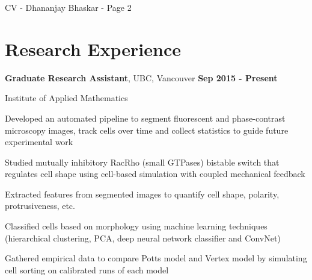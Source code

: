 \documentclass[margin,line]{res}
\newenvironment{list1}{
  \begin{list}{\ding{113}}{
      \setlength{\itemsep}{0in}
      \setlength{\parsep}{0in} \setlength{\parskip}{0in}
      \setlength{\topsep}{0in} \setlength{\partopsep}{0in} 
      \setlength{\leftmargin}{0.17in}}}{\end{list}}
\newenvironment{list3}{
  \begin{list}{\textopenbullet}{
      \setlength{\itemsep}{0in}
      \setlength{\parsep}{0in} \setlength{\parskip}{0in}
      \setlength{\topsep}{0in} \setlength{\partopsep}{0in} 
      \setlength{\leftmargin}{0.1in}}}{\end{list}}
\begin{document}
\begin{resume}
\newpage
\begin{flushright}
CV - Dhananjay Bhaskar - Page 2
\end{flushright}
\vspace*{.2cm}

\section{\sc Research Experience}

{\bf Graduate Research Assistant}, UBC, Vancouver \hfill {\bf Sep 2015 - Present}\\
\vspace*{-.2cm}
\begin{list1}
\item[] Institute of Applied Mathematics
\vspace*{.1cm}
\begin{list3}
\item Developed an automated pipeline to segment fluorescent and phase-contrast microscopy images, track cells over time and collect statistics to guide future experimental work
\item Studied mutually inhibitory Rac{\textendash}Rho (small GTPases) bistable switch that regulates cell shape using cell-based simulation with coupled mechanical feedback
\item Extracted features from segmented images to quantify cell shape, polarity, protrusiveness, etc.
\item Classified cells based on morphology using machine learning techniques (hierarchical clustering, PCA, deep neural network classifier and ConvNet)
\item Gathered empirical data to compare Potts model and Vertex model by simulating cell sorting on calibrated runs of each model
\end{list3}
\end{list1}
\vspace*{.2cm}


\end{resume}
\end{document}

